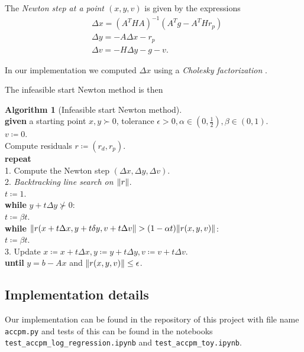 \documentclass[11pt]{amsart}
\theoremstyle{definition}
\newtheorem{algorithm}{Algorithm}
\theoremstyle{remark}
\newcommand{\ind}{\hspace*{0.5cm}}
\newcommand{\transpose}{T}
\begin{document}
    The \emph{Newton step at a point $(x, y, v)$} is given by the expressions
    \begin{align*}
        &\Delta x = (A^\transpose HA)^{-1}(A^\transpose g - A^\transpose Hr_p)\\
        &\Delta y = - A\Delta x - r_p \\
        &\Delta v = - H\Delta y - g - v.
    \end{align*}

    In our implementation we computed $\Delta x$ using a \emph{Cholesky factorization} \cite[Appendix C.3]{BV04}. 

    The infeasible start Newton method is then
    \begin{algorithm}[Infeasible start Newton method]
    \label{a:infeasible}\mbox{}\\
        \ind \textbf{given} a starting point $x, y \succ 0$, tolerance $\epsilon > 0, \alpha \in (0, \frac{1}{2}), \beta \in (0, 1)$. \\
        \ind $v \coloneqq 0$. \\
        \ind Compute residuals $r \coloneqq (r_d, r_p)$. \\
        \ind \textbf{repeat} \\
        \ind\ind 1. Compute the Newton step $(\Delta x, \Delta y, \Delta v)$. \\
        \ind\ind 2. \emph{Backtracking line search on $\norm{r}$}. \\
        \ind\ind\ind $t \coloneqq 1$. \\
        \ind\ind\ind \textbf{while } $y + t\Delta y \not\succ 0$: \\
        \ind\ind\ind\ind $t \coloneqq \beta t$. \\
        \ind\ind\ind \textbf{while} $\norm{r(x + t\Delta x, y + t \delta y, v + t \Delta v} > (1 - \alpha t)\norm{r(x, y, v)}$: \\
        \ind\ind\ind\ind $t \coloneqq \beta t$. \\
        \ind\ind 3. Update $x \coloneqq x +  t\Delta x, y \coloneqq y + t \Delta y, v \coloneqq v + t \Delta v.$ \\
        \ind \textbf{until} $y = b - Ax$ and $\norm{r(x, y, v)} \leq \epsilon$.
    \end{algorithm}
    \subsection{Implementation details}
        Our implementation can be found in the repository of this project with file name \texttt{accpm.py} and tests of this can be found in the notebooks \texttt{test\_accpm\_log\_regression.ipynb} and \texttt{test\_accpm\_toy.ipynb}. 
\end{document}
